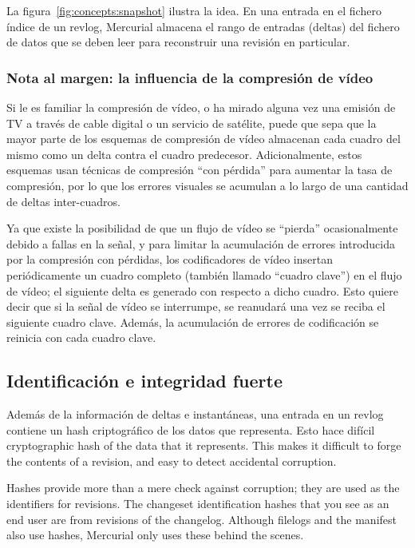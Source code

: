 La figura~\ref{fig:concepts:snapshot} ilustra la idea. En una entrada en el
fichero índice de un revlog, Mercurial almacena el rango de entradas (deltas)
del fichero de datos que se deben leer para reconstruir una revisión en
particular.

\subsubsection{Nota al margen: la influencia de la compresión de vídeo}

Si le es familiar la compresión de vídeo, o ha mirado alguna vez una emisión de
TV a través de cable digital o un servicio de satélite, puede que sepa que la 
mayor parte de los esquemas de compresión de vídeo almacenan cada cuadro del
mismo como un delta contra el cuadro predecesor. Adicionalmente, estos esquemas
usan técnicas de compresión ``con pérdida'' para aumentar la tasa de
compresión, por lo que los errores visuales se acumulan a lo largo de una
cantidad de deltas inter-cuadros.

Ya que existe la posibilidad de que un flujo de vídeo se ``pierda''
ocasionalmente debido a fallas en la señal, y para limitar la acumulación de
errores introducida por la compresión con pérdidas, los codificadores de vídeo
insertan periódicamente un cuadro completo (también llamado ``cuadro clave'') en
el flujo de vídeo; el siguiente delta es generado con respecto a dicho cuadro.
Esto quiere decir que si la señal de vídeo se interrumpe, se reanudará una vez
se reciba el siguiente cuadro clave. Además, la acumulación de errores de
codificación se reinicia con cada cuadro clave.

\subsection{Identificación e integridad fuerte}

Además de la información de deltas e instantáneas, una entrada en un revlog
contiene un hash criptográfico de los datos que representa. Esto hace difícil 
cryptographic hash of the data that it represents.  This makes it
difficult to forge the contents of a revision, and easy to detect
accidental corruption.  

Hashes provide more than a mere check against corruption; they are
used as the identifiers for revisions.  The changeset identification
hashes that you see as an end user are from revisions of the
changelog.  Although filelogs and the manifest also use hashes,
Mercurial only uses these behind the scenes.

